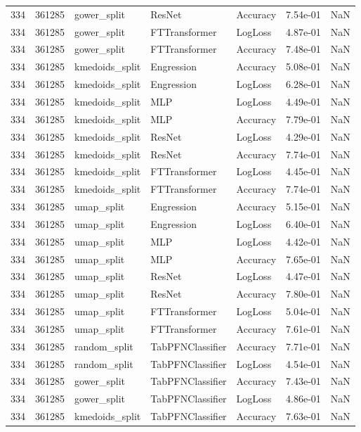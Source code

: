 \begin{tabular}{rrlllrr}
334 & 361285 & gower\_split & ResNet & Accuracy & 7.54e-01 & NaN \\
334 & 361285 & gower\_split & FTTransformer & LogLoss & 4.87e-01 & NaN \\
334 & 361285 & gower\_split & FTTransformer & Accuracy & 7.48e-01 & NaN \\
334 & 361285 & kmedoids\_split & Engression & Accuracy & 5.08e-01 & NaN \\
334 & 361285 & kmedoids\_split & Engression & LogLoss & 6.28e-01 & NaN \\
334 & 361285 & kmedoids\_split & MLP & LogLoss & 4.49e-01 & NaN \\
334 & 361285 & kmedoids\_split & MLP & Accuracy & 7.79e-01 & NaN \\
334 & 361285 & kmedoids\_split & ResNet & LogLoss & 4.29e-01 & NaN \\
334 & 361285 & kmedoids\_split & ResNet & Accuracy & 7.74e-01 & NaN \\
334 & 361285 & kmedoids\_split & FTTransformer & LogLoss & 4.45e-01 & NaN \\
334 & 361285 & kmedoids\_split & FTTransformer & Accuracy & 7.74e-01 & NaN \\
334 & 361285 & umap\_split & Engression & Accuracy & 5.15e-01 & NaN \\
334 & 361285 & umap\_split & Engression & LogLoss & 6.40e-01 & NaN \\
334 & 361285 & umap\_split & MLP & LogLoss & 4.42e-01 & NaN \\
334 & 361285 & umap\_split & MLP & Accuracy & 7.65e-01 & NaN \\
334 & 361285 & umap\_split & ResNet & LogLoss & 4.47e-01 & NaN \\
334 & 361285 & umap\_split & ResNet & Accuracy & 7.80e-01 & NaN \\
334 & 361285 & umap\_split & FTTransformer & LogLoss & 5.04e-01 & NaN \\
334 & 361285 & umap\_split & FTTransformer & Accuracy & 7.61e-01 & NaN \\
334 & 361285 & random\_split & TabPFNClassifier & Accuracy & 7.71e-01 & NaN \\
334 & 361285 & random\_split & TabPFNClassifier & LogLoss & 4.54e-01 & NaN \\
334 & 361285 & gower\_split & TabPFNClassifier & Accuracy & 7.43e-01 & NaN \\
334 & 361285 & gower\_split & TabPFNClassifier & LogLoss & 4.86e-01 & NaN \\
334 & 361285 & kmedoids\_split & TabPFNClassifier & Accuracy & 7.63e-01 & NaN \\

\end{tabular}
